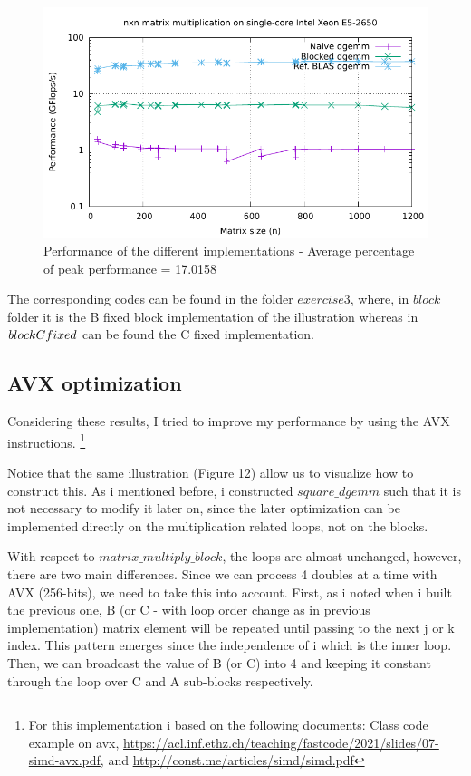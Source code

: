 \documentclass[unicode,11pt,a4paper,oneside,numbers=endperiod,openany]{scrartcl}
\begin{document}
\begin{figure}[H]
    \centering
    \includegraphics[width=\textwidth]{./exercise3/block-Cfixed/timing.pdf}
    \caption{Performance of the different implementations - Average percentage of peak performance = 17.0158} 
\end{figure}

The corresponding codes can be found in the folder $exercise3$, where, in $block$ folder it is the B fixed block implementation of the illustration whereas in $block\-Cfixed$ 
can be found the C fixed implementation.

\subsection{AVX optimization}
Considering these results, I tried to improve my performance by using the AVX instructions. \footnote{For this implementation i based on the following documents: 
Class code example on avx, \url{https://acl.inf.ethz.ch/teaching/fastcode/2021/slides/07-simd-avx.pdf}, and \url{http://const.me/articles/simd/simd.pdf}
}

Notice that the same illustration (Figure 12) allow us to visualize how to construct this. As i mentioned before, i constructed $square\_dgemm$ such that 
it is not necessary to modify it later on, since the later optimization can be implemented directly on the multiplication related loops, not on the blocks. 

With respect to $matrix\_multiply\_block$, the loops are almost unchanged, however, there are two main differences. 
Since we can process 4 doubles at a time with AVX (256-bits), we need to take this into account.
First, as i noted when i built the previous one, B (or C - with loop order change as in previous implementation) matrix element will be repeated until passing to the next j or k index. This pattern emerges since the independence of i
which is the inner loop. Then, we can broadcast the value of B (or C) into 4 and keeping it constant through the loop over C and A sub-blocks respectively.
\end{document}
